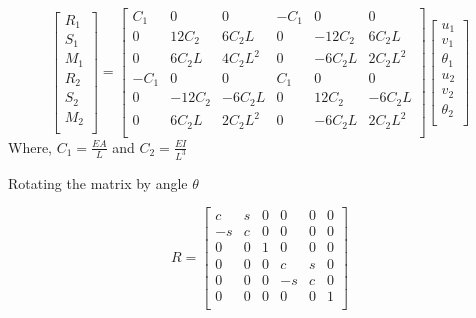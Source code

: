 \documentclass{report}
\begin{document}
\[
  \begin{bmatrix}
    R_1 \\ 
    S_1 \\
    M_1\\
    R_2 \\ 
    S_2 \\
    M_2\\
  \end{bmatrix}
  = 
  \begin{bmatrix}
    C_1 & 0 & 0 & -C_1 & 0 & 0 \\ 
    0 & 12C_2 & 6C_2L & 0 & -12C_2 & 6C_2L \\
    0 & 6C_2L & 4C_2L^2 & 0 & -6C_2L & 2C_2L^2 \\
    -C_1 & 0 & 0 & C_1 & 0 & 0 \\ 
    0 & -12C_2 & -6C_2L & 0 & 12C_2 & -6C_2L \\
    0 & 6C_2L & 2C_2L^2 & 0 & -6C_2L & 2C_2L^2 \\
  \end{bmatrix}
  \begin{bmatrix}
    u_1 \\ 
    v_1 \\ 
    \theta_1 \\
    u_2 \\ 
    v_2 \\ 
    \theta_2 \\
  \end{bmatrix}
\]
Where, $C_1 = \frac{EA}{L}$ and $C_2 = \frac{EI}{L^3}$

Rotating the matrix by angle $\theta$

\[
  R = \begin{bmatrix}
    c & s & 0 & 0 & 0 & 0 \\ 
    -s & c & 0 & 0 & 0 & 0 \\ 
    0 & 0 & 1 & 0 & 0 & 0 \\
    0 & 0 & 0 & c & s & 0 \\ 
    0 & 0 & 0 & -s & c & 0 \\ 
    0 & 0 & 0 & 0 & 0 & 1 \\
  \end{bmatrix}
\]
\end{document}
